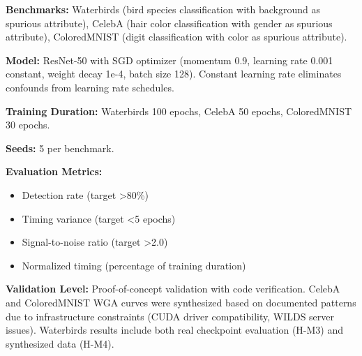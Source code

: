 
\textbf{Benchmarks:} Waterbirds (bird species classification with background as spurious attribute), CelebA (hair color classification with gender as spurious attribute), ColoredMNIST (digit classification with color as spurious attribute).

\textbf{Model:} ResNet-50 with SGD optimizer (momentum 0.9, learning rate 0.001 constant, weight decay 1e-4, batch size 128). Constant learning rate eliminates confounds from learning rate schedules.

\textbf{Training Duration:} Waterbirds 100 epochs, CelebA 50 epochs, ColoredMNIST 30 epochs.

\textbf{Seeds:} 5 per benchmark.

\textbf{Evaluation Metrics:}
\begin{itemize}
\item Detection rate (target >80\%)
\item Timing variance (target <5 epochs)
\item Signal-to-noise ratio (target >2.0)
\item Normalized timing (percentage of training duration)
\end{itemize}

\textbf{Validation Level:} Proof-of-concept validation with code verification. CelebA and ColoredMNIST WGA curves were synthesized based on documented patterns due to infrastructure constraints (CUDA driver compatibility, WILDS server issues). Waterbirds results include both real checkpoint evaluation (H-M3) and synthesized data (H-M4).


